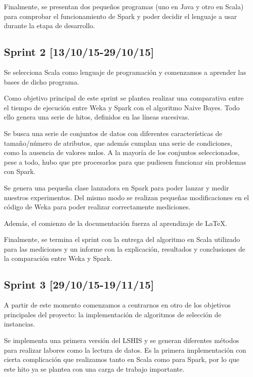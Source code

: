 Finalmente, se presentan dos pequeños programas (uno en Java y otro en Scala) para comprobar el funcionamiento de Spark y poder decidir el lenguaje a usar durante la etapa de desarrollo.

\subsection{Sprint 2 [13/10/15-29/10/15]}

Se selecciona Scala como lenguaje de programación y comenzamos a aprender las bases de dicho programa.

Como objetivo principal de este sprint se plantea realizar una comparativa entre el tiempo de ejecución entre Weka y Spark con el algoritmo Naive Bayes. Todo ello genera una serie de hitos, definidos en las líneas sucesivas.

Se busca una serie de conjuntos de datos con diferentes características de tamaño/número de atributos, que además cumplan una serie de condiciones, como la ausencia de valores nulos. A la mayoría de los conjuntos seleccionados, pese a todo, hubo que pre procesarlos para que pudiesen funcionar sin problemas con Spark.

Se genera una pequeña clase lanzadora en Spark para poder lanzar y medir nuestros experimentos. Del mismo modo se realizan pequeñas modificaciones en el código de Weka para poder realizar correctamente mediciones.

Además, el comienzo de la documentación fuerza al aprendizaje de \LaTeX.

Finalmente, se termina el sprint con la entrega del algoritmo en Scala utilizado para las mediciones y un informe con la explicación, resultados y conclusiones de la comparación entre Weka y Spark.

\subsection{Sprint 3 [29/10/15-19/11/15]}

A partir de este momento comenzamos a centrarnos en otro de los objetivos principales del proyecto: la implementación de algoritmos de selección de instancias.
 
Se implementa una primera versión del LSHIS y se generan diferentes métodos para realizar labores como la lectura de datos. Es la primera implementación con cierta complicación que realizamos tanto en Scala como para Spark, por lo que este hito ya se plantea con una carga de trabajo importante.

